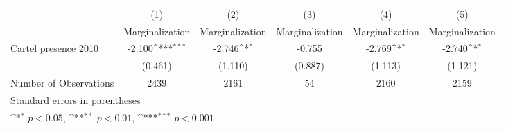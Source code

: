 {
\def\sym#1{\ifmmode^{#1}\else\(^{#1}\)\fi}
\begin{tabular}{l*{5}{c}}
\hline\hline
                    &\multicolumn{1}{c}{(1)}&\multicolumn{1}{c}{(2)}&\multicolumn{1}{c}{(3)}&\multicolumn{1}{c}{(4)}&\multicolumn{1}{c}{(5)}\\
                    &\multicolumn{1}{c}{Marginalization}&\multicolumn{1}{c}{Marginalization}&\multicolumn{1}{c}{Marginalization}&\multicolumn{1}{c}{Marginalization}&\multicolumn{1}{c}{Marginalization}\\
\hline
Cartel presence 2010&      -2.100\sym{***}&      -2.746\sym{*}  &      -0.755         &      -2.769\sym{*}  &      -2.740\sym{*}  \\
                    &     (0.461)         &     (1.110)         &     (0.887)         &     (1.113)         &     (1.121)         \\
\hline
Number of Observations&        2439         &        2161         &          54         &        2160         &        2159         \\
\hline\hline
\multicolumn{6}{l}{\footnotesize Standard errors in parentheses}\\
\multicolumn{6}{l}{\footnotesize \sym{*} \(p<0.05\), \sym{**} \(p<0.01\), \sym{***} \(p<0.001\)}\\
\end{tabular}
}
